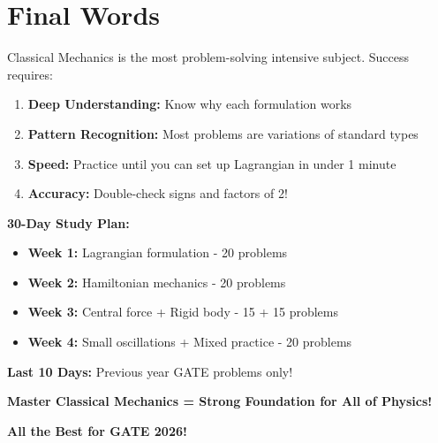 \documentclass[12pt,a4paper]{article}
\theoremstyle{definition}
\begin{document}
\newpage
\section{Final Words}

Classical Mechanics is the most problem-solving intensive subject. Success requires:

\begin{enumerate}
    \item \textbf{Deep Understanding:} Know why each formulation works
    \item \textbf{Pattern Recognition:} Most problems are variations of standard types
    \item \textbf{Speed:} Practice until you can set up Lagrangian in under 1 minute
    \item \textbf{Accuracy:} Double-check signs and factors of 2!
\end{enumerate}

\begin{importantbox}
\textbf{30-Day Study Plan:}
\begin{itemize}
    \item \textbf{Week 1:} Lagrangian formulation - 20 problems
    \item \textbf{Week 2:} Hamiltonian mechanics - 20 problems
    \item \textbf{Week 3:} Central force + Rigid body - 15 + 15 problems
    \item \textbf{Week 4:} Small oscillations + Mixed practice - 20 problems
\end{itemize}

\textbf{Last 10 Days:} Previous year GATE problems only!
\end{importantbox}

\vspace{1cm}
\begin{center}
\textbf{\Large Master Classical Mechanics = Strong Foundation for All of Physics!}

\vspace{0.5cm}
\textbf{\Large All the Best for GATE 2026!}
\end{center}
\end{document}
